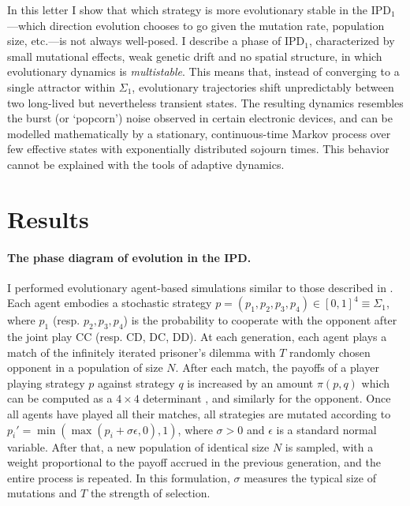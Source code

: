 \documentclass[12pt]{article}
\def\IPD{\textrm{IPD}}
\def\IPD1{\textrm{IPD}_1}
\begin{document}
In this letter I show that which strategy is more evolutionary stable in the $\IPD1$---which direction evolution chooses to go given the mutation rate, population size, etc.---is not always well-posed. I describe a phase of $\IPD1$, characterized by small mutational effects, weak genetic drift and no spatial structure, in which evolutionary dynamics is \emph{multistable}. This means that, instead of converging to a single attractor within $\Sigma_1$, evolutionary trajectories shift unpredictably between two long-lived but nevertheless transient states. The resulting dynamics resembles the burst (or `popcorn') noise observed in certain electronic devices, and can be modelled mathematically by a stationary, continuous-time Markov process over few effective states with exponentially distributed sojourn times. This behavior cannot be explained with the tools of adaptive dynamics. 

\section*{Results}

\paragraph*{The phase diagram of evolution in the IPD.} I performed evolutionary agent-based simulations similar to those described in \cite{iliopoulos_critical_2010}. Each agent embodies a stochastic strategy $p=(p_1, p_2, p_3, p_4)\in[0,1]^4 \equiv \Sigma_1$, where $p_1$ (resp. $p_2, p_3, p_4$) is the probability to cooperate with the opponent after the joint play CC (resp. CD, DC, DD). At each generation, each agent plays a match of the infinitely iterated prisoner's dilemma with $T$ randomly chosen opponent in a population of size $N$. After each match, the payoffs of a player playing strategy $p$ against strategy $q$ is increased by an amount $\pi(p,q)$ which can be computed as a $4\times 4$ determinant \cite{press_iterated_2012}, and similarly for the opponent. Once all agents have played all their matches, all strategies are mutated according to $p_i' = \min(\max(p_i + \sigma \epsilon, 0), 1)$, where $\sigma > 0$ and $\epsilon$ is a standard normal variable. After that, a new population of identical size $N$ is sampled, with a weight proportional to the payoff accrued in the previous generation, and the entire process is repeated. In this formulation, $\sigma$ measures the typical size of mutations and $T$ the strength of selection. 
\end{document}
